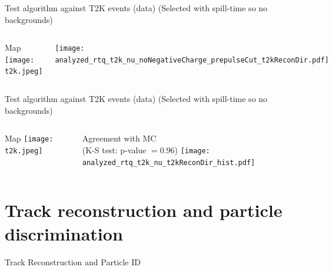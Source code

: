 \documentclass[14pt]{beamer}
\begin{document}
\begin{frame}{Test algorithm against T2K events (data)}
	{\small(Selected with spill-time so no backgrounds)}
	\begin{columns}[t]
		\begin{block}{\centering\small{Map}}
			\vspace{10mm}
			\texttt{[image: t2k.jpeg]}
		\end{block}
		\begin{block}{}
			\vspace{4mm}
			\texttt{[image: analyzed\_rtq\_t2k\_nu\_noNegativeCharge\_prepulseCut\_t2kReconDir.pdf]}
		\end{block}
	\end{columns}
\end{frame}

\begin{frame}{Test algorithm against T2K events (data)}
	{\small(Selected with spill-time so no backgrounds)}
	\begin{columns}[t]
		\begin{block}{\centering\small{Map}}
			\vspace{10mm}
			\texttt{[image: t2k.jpeg]}
		\end{block}
		\begin{block}{\centering\small{Agreement with MC}\\
				\footnotesize{(K-S test: p-value $= 0.96$)}}
			\vspace{5mm}
			\texttt{[image: analyzed\_rtq\_t2k\_nu\_t2kReconDir\_hist.pdf]}
		\end{block}
	\end{columns}
\end{frame}

\section{Track reconstruction and particle discrimination}
\begin{frame}
	\centering
	{\huge Track Reconstruction and Particle ID}\par
\end{frame}
\end{document}
